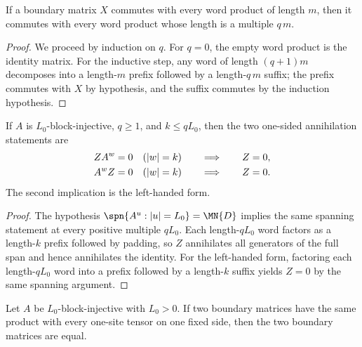 \begin{lemma}
    \label{lem:word_commutation_multiple_lengths}
    \leanok
    If a boundary matrix $X$ commutes with every word product of length $m$,
    then it commutes with every word product whose length is a multiple $q\,m$.
\end{lemma}

\begin{proof}
    \leanok
    We proceed by induction on $q$. For $q=0$, the empty word product is the
    identity matrix. For the inductive step, any word of length $(q+1)m$
    decomposes into a length-$m$ prefix followed by a length-$q\,m$ suffix; the
    prefix commutes with $X$ by hypothesis, and the suffix commutes by the
    induction hypothesis.
\end{proof}

\begin{lemma}
    \label{lem:padded_complement_annihilation}
    \leanok
    If $A$ is $L_0$-block-injective, $q \ge 1$, and $k \le qL_0$, then the two
    one-sided annihilation statements are
    \begin{align}
        Z A^w = 0 \quad (|w|=k)
         & \qquad\Longrightarrow\qquad Z=0, \notag \\
        A^w Z = 0 \quad (|w|=k)
         & \qquad\Longrightarrow\qquad Z=0. \notag
    \end{align}
    The second implication is the left-handed form.
\end{lemma}

\begin{proof}
    \leanok
    The hypothesis $\spn\{A^u : |u|=L_0\}=\MN{D}$ implies the same spanning
    statement at every positive multiple $qL_0$. Each length-$qL_0$ word
    factors as a length-$k$ prefix followed by padding, so $Z$ annihilates all
    generators of the full span and hence annihilates the identity. For the
    left-handed form, factoring each length-$qL_0$ word into a prefix followed
    by a length-$k$ suffix yields $Z = 0$ by the same spanning argument.
\end{proof}

\begin{lemma}
    \label{lem:one_sided_boundary_witness_unique}
    \leanok
    Let $A$ be $L_0$-block-injective with $L_0>0$. If two boundary matrices
    have the same product with every one-site tensor on one fixed side, then the
    two boundary matrices are equal.
\end{lemma}

